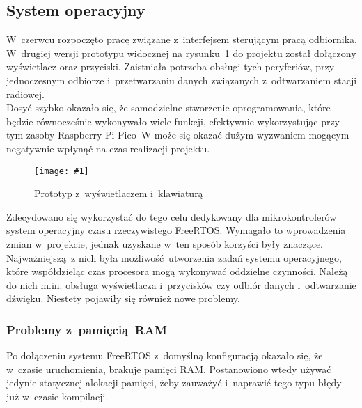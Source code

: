 \documentclass[polish]{aghengthesis}
\newcommand{\imgint}[4]{
	\begin{figure}[{#4}]
		\centering
		\texttt{[image: \#1]}
		\caption{#2}
		\label{#1}
	\end{figure}
}
\newcommand{\imgh}[3]{\imgint{#1}{#2}{#3}{H}}
\begin{document}
			
		\subsection{System operacyjny}
			W~czerwcu rozpoczęto pracę związane z~interfejsem sterującym pracą odbiornika.
			W~drugiej wersji prototypu widocznej na rysunku~\ref{4/prototype_2} do projektu został dołączony wyświetlacz oraz przyciski. Zaistniała potrzeba obsługi tych peryferiów, przy jednoczesnym odbiorze i~przetwarzaniu danych związanych z~odtwarzaniem stacji radiowej.
			$ $\\
			
			Dosyć szybko okazało się, że samodzielne stworzenie oprogramowania, które będzie równocześnie wykonywało wiele funkcji, efektywnie wykorzystując przy tym zasoby Raspberry Pi Pico~W może się okazać dużym wyzwaniem mogącym negatywnie wpłynąć na czas realizacji projektu.
			
			\imgh{4/prototype_2}{Prototyp z~wyświetlaczem i~klawiaturą}{0.8}
			
			Zdecydowano się wykorzystać do tego celu dedykowany dla mikrokontrolerów system operacyjny czasu rzeczywistego FreeRTOS. Wymagało to wprowadzenia zmian w~projekcie, jednak uzyskane w~ten sposób korzyści były znaczące.
			Najważniejszą z nich była możliwość utworzenia zadań systemu operacyjnego, które współdzieląc czas procesora mogą wykonywać oddzielne czynności.
			Należą do nich m.in. obsługa wyświetlacza i~przycisków czy odbiór danych i~odtwarzanie dźwięku.
			Niestety pojawiły się również nowe problemy.
			
			\subsubsection{Problemy z~pamięcią RAM}
				Po dołączeniu systemu FreeRTOS z~domyślną konfiguracją okazało się, że w~czasie uruchomienia, brakuje pamięci RAM.
				Postanowiono wtedy używać jedynie statycznej alokacji pamięci, żeby zauważyć i~naprawić tego typu błędy już w~czasie kompilacji.
				$ $\\
\end{document}
